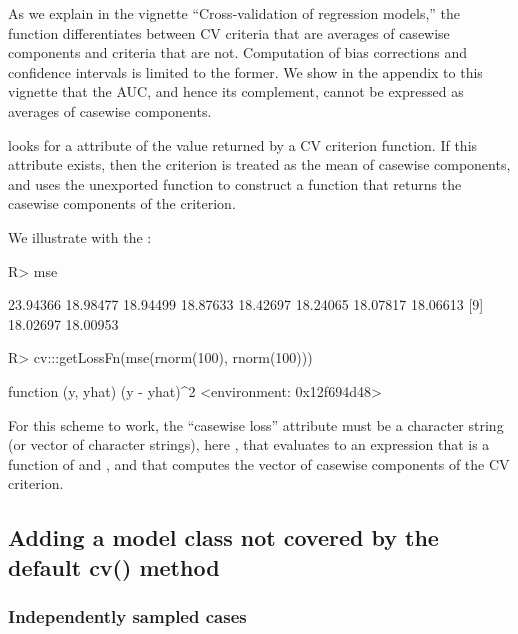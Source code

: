 \documentclass[
]{jss}
\begin{document}
As we explain in the vignette ``Cross-validation of regression models,''
the  function differentiates between CV criteria that are
averages of casewise components and criteria that are not. Computation
of bias corrections and confidence intervals is limited to the former.
We show in the appendix to this vignette that the AUC, and hence its
complement, cannot be expressed as averages of casewise components.

 looks for a  attribute of the value
returned by a CV criterion function. If this attribute exists, then the
criterion is treated as the mean of casewise components, and 
uses the unexported function  to construct a function
that returns the casewise components of the criterion.

We illustrate with the :

\begin{CodeChunk}
\begin{CodeInput}
R> mse
\end{CodeInput}
\begin{CodeOutput}
 [1] 23.94366 18.98477 18.94499 18.87633 18.42697 18.24065 18.07817 18.06613
 [9] 18.02697 18.00953
\end{CodeOutput}
\begin{CodeInput}
R> cv:::getLossFn(mse(rnorm(100), rnorm(100)))
\end{CodeInput}
\begin{CodeOutput}
function (y, yhat) 
{
    (y - yhat)^2
}
<environment: 0x12f694d48>
\end{CodeOutput}
\end{CodeChunk}

For this scheme to work, the ``casewise loss'' attribute must be a
character string (or vector of character strings), here
, that evaluates to an expression that is a
function of  and , and that computes the vector of
casewise components of the CV criterion.

\hypertarget{adding-a-model-class-not-covered-by-the-default-cv-method}{%
\subsection{Adding a model class not covered by the default cv()
method}\label{adding-a-model-class-not-covered-by-the-default-cv-method}}

\hypertarget{independently-sampled-cases}{%
\subsubsection{Independently sampled
cases}\label{independently-sampled-cases}}
\end{document}
